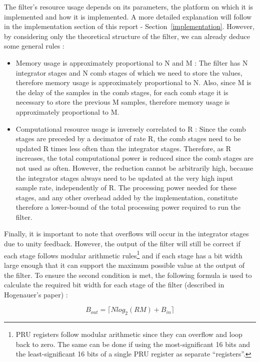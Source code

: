 \documentclass[]{report}
\providecommand{\tightlist}{%
	\setlength{\itemsep}{0pt}\setlength{\parskip}{0pt}}
\begin{document}
The filter's resource usage depends on its parameters, the platform on which it is implemented and how it is implemented. A more detailed explanation will follow in the implementation section of this report - Section~\ref{implementation}. However, by considering only the theoretical structure of the filter, we can already deduce some general rules :

\begin{itemize}
\tightlist
\item
  Memory usage is approximately proportional to N and M : The filter has N integrator stages and N comb stages of which we need to store the values, therefore memory usage is approximately proportional to N. Also, since M is the delay of the samples in the comb stages, for each comb stage it is necessary to store the previous M samples, therefore memory usage is approximately proportional to M.
\item
  Computational resource usage is inversely correlated to R : Since the comb stages are preceded by a decimator of rate R, the comb stages need to be updated R times less often than the integrator stages. Therefore, as R increases, the total computational power is reduced since the comb stages are not used as often. However, the reduction cannot be arbitrarily high, because the integrator stages always need to be updated at the very high input sample rate, independently of R. The processing power needed for these stages, and any other overhead added by the implementation, constitute therefore a lower-bound of the total processing power required to run the filter.
\end{itemize}

Finally, it is important to note that overflows will occur in the integrator stages due to unity feedback. However, the output of the filter will still be correct if each stage follows modular arithmetic rules\footnote{PRU registers follow modular arithmetic since they can overflow and loop back to zero. The same can be done if using the most-significant 16 bits and the least-significant 16 bits of a single PRU register as separate ``registers''.} and if each stage has a bit width large enough that it can support the maximum possible value at the output of the filter. To ensure the second condition is met, the following formula is used to calculate the required bit width for each stage of the filter (described in Hogenauer's paper) :

\begin{equation}
\label{eq:bout}
B_{out} = \lceil Nlog_2(RM) + B_{in} \rceil
\end{equation}
\end{document}
